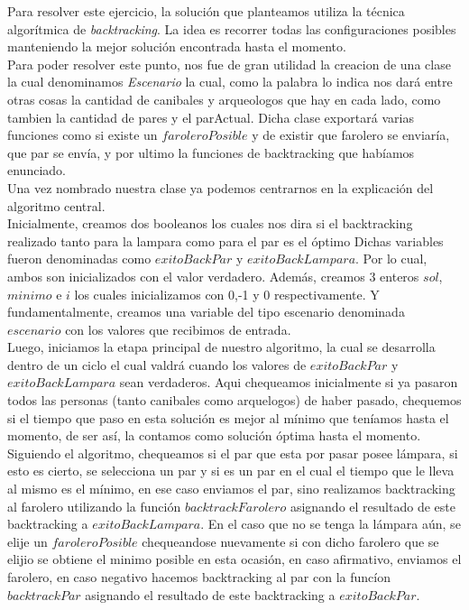 
Para resolver este ejercicio, la soluci\'on que planteamos utiliza la t\'ecnica algor\'itmica de \textit{backtracking}. La idea es recorrer todas las configuraciones posibles manteniendo la mejor soluci\'on encontrada hasta el momento.\\

Para poder resolver este punto, nos fue de gran utilidad la creacion de una clase la cual denominamos \textit{Escenario} la cual, como la palabra lo indica nos dar\'a entre otras cosas la cantidad de canibales y arqueologos que hay en cada lado, como tambien la cantidad de pares y el parActual. Dicha clase exportar\'a varias funciones como si existe un $faroleroPosible$ y de existir que farolero se enviar\'ia, que par se env\'ia,  y por ultimo la funciones de backtracking que hab\'iamos enunciado.\\

Una vez nombrado nuestra clase ya podemos centrarnos en la explicaci\'on del algoritmo central.\\
Inicialmente, creamos dos booleanos los cuales nos dira si el backtracking realizado tanto para la lampara como para el par es el \'optimo Dichas variables fueron denominadas como $exitoBackPar$ y $exitoBackLampara$. Por lo cual, ambos son inicializados con el valor verdadero. Adem\'as, creamos 3 enteros $sol$, $minimo$ e $i$ los cuales inicializamos con 0,-1 y 0 respectivamente. Y fundamentalmente, creamos una variable del tipo escenario denominada $escenario$ con los valores que recibimos de entrada.\\
Luego, iniciamos la etapa principal de nuestro algoritmo, la cual se desarrolla dentro de un ciclo el cual  valdr\'a cuando los valores de $exitoBackPar$ y $exitoBackLampara$ sean verdaderos. Aqui chequeamos inicialmente si ya pasaron todos las personas (tanto canibales como arquelogos) de haber pasado, chequemos si el tiempo que paso en esta soluci\'on es mejor al m\'inimo que ten\'iamos hasta el momento, de ser as\'i, la contamos como soluci\'on \'optima hasta el momento.\\ 
Siguiendo el algoritmo, chequeamos si el par que esta por pasar posee l\'ampara, si esto es cierto, se selecciona un par y si es un par en el cual el tiempo que le lleva al mismo es el m\'inimo, en ese caso enviamos el par, sino realizamos backtracking al farolero utilizando la funci\'on $backtrackFarolero$ asignando el resultado de este backtracking a $exitoBackLampara$. En el caso que no se tenga la l\'ampara a\'un, se elije un $faroleroPosible$ chequeandose nuevamente si con dicho farolero que se elijio se obtiene el minimo posible en esta ocasi\'on, en caso afirmativo, enviamos el farolero, en caso negativo hacemos backtracking al par con la func\'ion $backtrackPar$ asignando el resultado de este backtracking a $exitoBackPar$.\\

